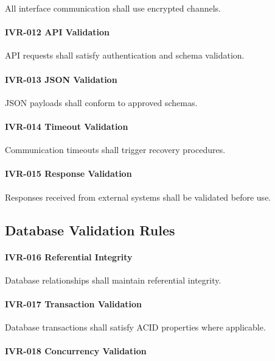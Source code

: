 All interface communication shall use encrypted channels.

\paragraph{IVR-012 API Validation}

API requests shall satisfy authentication and schema validation.

\paragraph{IVR-013 JSON Validation}

JSON payloads shall conform to approved schemas.

\paragraph{IVR-014 Timeout Validation}

Communication timeouts shall trigger recovery procedures.

\paragraph{IVR-015 Response Validation}

Responses received from external systems shall be validated before use.


\subsection{Database Validation Rules}

\paragraph{IVR-016 Referential Integrity}

Database relationships shall maintain referential integrity.

\paragraph{IVR-017 Transaction Validation}

Database transactions shall satisfy ACID properties where applicable.

\paragraph{IVR-018 Concurrency Validation}


